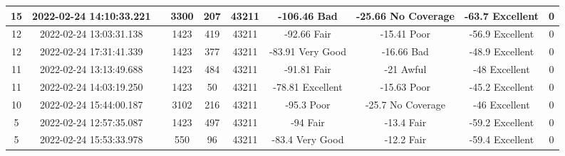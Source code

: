 \begin{longtable*}{|c|c|c|c|c|c|c|c|c|c|}
15&2022-02-24 14:10:33.221&&3300&207&43211& -106.46   Bad         & -25.66    No Coverage & -63.7     Excellent   & 0\\\hline
{}12&2022-02-24 13:03:31.138&&1423&419&43211& -92.66    Fair        & -15.41    Poor        & -56.9     Excellent   & 0\\\hline
{}12&2022-02-24 17:31:41.339&&1423&377&43211& -83.91    Very Good   & -16.66    Bad         & -48.9     Excellent   & 0\\\hline
{}11&2022-02-24 13:13:49.688&&1423&484&43211& -91.81    Fair        & -21       Awful       & -48       Excellent   & 0\\\hline
{}11&2022-02-24 14:03:19.250&&1423&50&43211& -78.81    Excellent   & -15.63    Poor        & -45.2     Excellent   & 0\\\hline
{}10&2022-02-24 15:44:00.187&&3102&216&43211& -95.3     Poor        & -25.7     No Coverage & -46       Excellent   & 0\\\hline
{}5&2022-02-24 12:57:35.087&&1423&497&43211& -94       Fair        & -13.4     Fair        & -59.2     Excellent   & 0\\\hline
{}5&2022-02-24 15:53:33.978&&550&96&43211& -83.4     Very Good   & -12.2     Fair        & -59.4     Excellent   & 0\\\hline

\end{longtable*}
